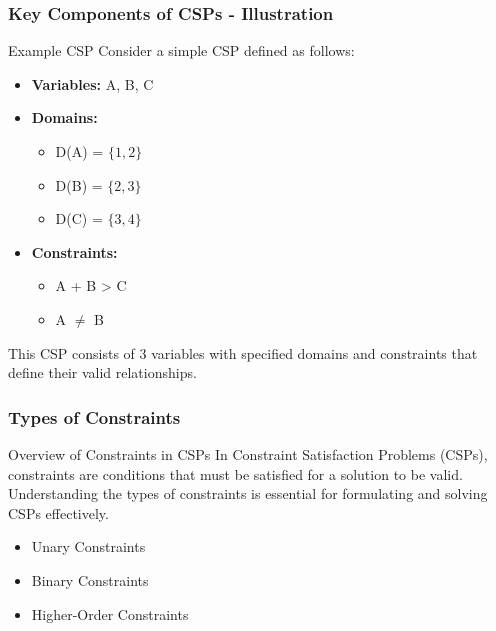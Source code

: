\documentclass[aspectratio=169]{beamer}
\begin{document}
\begin{frame}[fragile]
    \frametitle{Key Components of CSPs - Illustration}
    \begin{block}{Example CSP}
        Consider a simple CSP defined as follows:
    \end{block}
    
    \begin{itemize}
        \item \textbf{Variables:} A, B, C
        \item \textbf{Domains:}
          \begin{itemize}
            \item D(A) = $\{1, 2\}$
            \item D(B) = $\{2, 3\}$
            \item D(C) = $\{3, 4\}$
          \end{itemize}
        \item \textbf{Constraints:}
          \begin{itemize}
            \item A + B > C
            \item A $\neq$ B
          \end{itemize}
    \end{itemize}
    
    This CSP consists of 3 variables with specified domains and constraints that define their valid relationships.
\end{frame}

\begin{frame}[fragile]
    \frametitle{Types of Constraints}
    \begin{block}{Overview of Constraints in CSPs}
        In Constraint Satisfaction Problems (CSPs), constraints are conditions that must be satisfied for a solution to be valid. Understanding the types of constraints is essential for formulating and solving CSPs effectively.
    \end{block}
    \begin{itemize}
        \item Unary Constraints
        \item Binary Constraints
        \item Higher-Order Constraints
    \end{itemize}
\end{frame}
\end{document}
